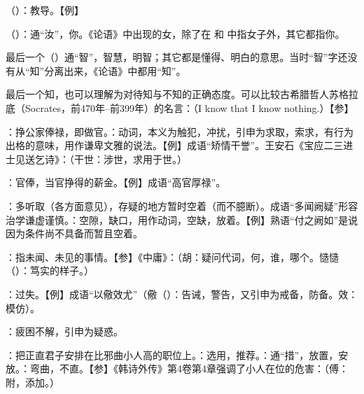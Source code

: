 {
\item {}（）：教导。【例】 
\item {}（）：通“汝”，你。《论语》中出现的女，除了在  和  中指女子外，其它都指你。
\item {}最后一个（）通“智”，智慧，明智；其它都是懂得、明白的意思。当时“智”字还没有从“知”分离出来，《论语》中都用“知”。

最后一个知，也可以理解为对待知与不知的正确态度。可以比较古希腊哲人苏格拉底（Socrates，前470年--前399年）的名言：（I know that I know nothing.）【参】 
}
{}  %


{
\item {}：挣公家俸禄，即做官。：动词，本义为触犯，冲扰，引申为求取，索求，有行为出格的意味，用作谦卑文雅的说法。【例】成语“矫情干誉”。王安石《宝应二三进士见送乞诗》：（干世：涉世，求用于世。）

：官俸，当官挣得的薪金。【例】成语“高官厚禄”。
\item {}：多听取（各方面意见），存疑的地方暂时空着（而不臆断）。成语“多闻阙疑”形容治学谦虚谨慎。：空隙，缺口，用作动词，空缺，放着。【例】熟语“付之阙如”是说因为条件尚不具备而暂且空着。
\item {}：指未闻、未见的事情。【参】《中庸》：（胡：疑问代词，何，谁，哪个。慥慥（）：笃实的样子。）
\item {}：过失。【例】成语“以儆效尤”（儆（）：告诫，警告，又引申为戒备，防备。效：模仿）。
\item {}：疲困不解，引申为疑惑。
}
{}


{
\item {}：把正直君子安排在比邪曲小人高的职位上。：选用，推荐。：通“措”，放置，安放。：弯曲，不直。【参】《韩诗外传》第4卷第4章强调了小人在位的危害：（傅：附，添加。）
}
{}


